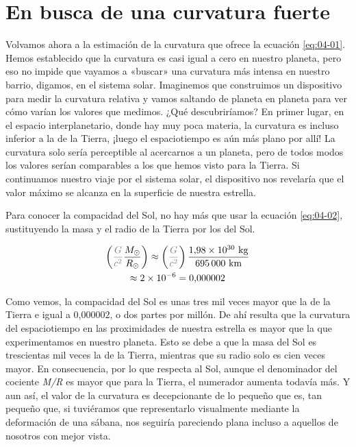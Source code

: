 \section{En busca de una curvatura fuerte}\label{sec:04-search}

Volvamos ahora a la estimación de la curvatura que ofrece la ecuación
\eqref{eq:04-01}. Hemos establecido que la curvatura es casi igual a cero en nuestro
planeta, pero eso no impide que vayamos a «buscar» una curvatura más intensa en
nuestro barrio, digamos, en el sistema solar. Imaginemos que construimos un
dispositivo para medir la curvatura relativa y vamos saltando de planeta en planeta
para ver cómo varían los valores que medimos. ¿Qué descubriríamos? En primer lugar,
en el espacio interplanetario, donde hay muy poca materia, la curvatura es incluso
inferior a la de la Tierra, ¡luego el espaciotiempo es aún más plano por allí! La
curvatura solo sería perceptible al acercarnos a un planeta, pero de todos modos
los valores serían comparables a los que hemos visto para la Tierra. Si continuamos
nuestro viaje por el sistema solar, el dispositivo nos revelaría que el valor
máximo se alcanza en la superficie de nuestra estrella.

Para conocer la compacidad del
Sol, no hay
más que usar la ecuación \eqref{eq:04-02}, sustituyendo la masa y el radio de la
Tierra por los del Sol.

\begin{equation}\label{eq:04-03}
\begin{gathered}
\left(\textcolor{gray}{\frac{G}{c^{2}}}\frac{M_{\odot}}{R_{\odot}}\right)
\approx \left(\textcolor{gray}{\frac{G}{c^{2}}}\right)\frac{1{,}98\times 10^{30}\ \mathrm{kg}}{695\,000\ \mathrm{km}} \\
\approx 2\times 10^{-6}=0{,}000002
\end{gathered}
\end{equation}


Como vemos, la compacidad del Sol es unas tres mil veces mayor
que la de la Tierra e igual a 0,000002, o dos partes por millón. De ahí resulta que
la curvatura del espaciotiempo en las proximidades de nuestra estrella es mayor que
la que experimentamos en nuestro planeta. Esto se debe a que la masa del Sol es
trescientas mil veces la de la Tierra, mientras que su radio solo es cien veces
mayor. En consecuencia, por lo que respecta al Sol, aunque el denominador del
cociente \emph{M/R} es mayor que para la Tierra, el numerador aumenta todavía más.
Y aun así, el valor de la curvatura es decepcionante de lo pequeño que es, tan
pequeño que, si tuviéramos que representarlo visualmente mediante la deformación de
una sábana, nos seguiría pareciendo plana incluso a aquellos de nosotros con mejor
vista.

